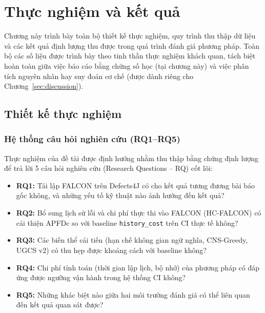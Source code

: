 \section{Thực nghiệm và kết quả}
\label{sec:experiments}
\label{sec:experiments_and_results}

Chương này trình bày toàn bộ thiết kế thực nghiệm, quy trình thu thập dữ liệu và các kết quả định lượng thu được trong quá trình đánh giá phương pháp. Toàn bộ các số liệu được trình bày theo tinh thần thực nghiệm khách quan, tách biệt hoàn toàn giữa việc báo cáo bằng chứng số học (tại chương này) và việc phân tích nguyên nhân hay suy đoán cơ chế (được dành riêng cho Chương~\ref{sec:discussion}).

\subsection{Thiết kế thực nghiệm}
\label{subsec:exp_design}

\subsubsection{Hệ thống câu hỏi nghiên cứu (RQ1--RQ5)}
\label{subsubsec:research_questions}

Thực nghiệm của đề tài được định hướng nhằm thu thập bằng chứng định lượng để trả lời 5 câu hỏi nghiên cứu (Research Questions -- RQ) cốt lõi:
\begin{itemize}
    \item \textbf{RQ1:} Tái lập FALCON trên Defects4J có cho kết quả tương đương bài báo gốc không, và những yếu tố kỹ thuật nào ảnh hưởng đến kết quả?
    \item \textbf{RQ2:} Bổ sung lịch sử lỗi và chi phí thực thi vào FALCON (HC-FALCON) có cải thiện APFDc so với baseline \texttt{history\_cost} trên CI thực tế không?
    \item \textbf{RQ3:} Các biến thể cải tiến (hạn chế không gian ngữ nghĩa, CNS-Greedy, UGCS v2) có thu hẹp được khoảng cách với baseline không?
    \item \textbf{RQ4:} Chi phí tính toán (thời gian lập lịch, bộ nhớ) của phương pháp có đáp ứng được ngưỡng vận hành trong hệ thống CI không?
    \item \textbf{RQ5:} Những khác biệt nào giữa hai môi trường đánh giá có thể liên quan đến kết quả quan sát được?
\end{itemize}

